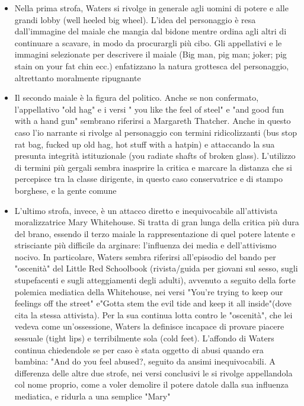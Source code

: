 \documentclass[class=book, crop=false, oneside, 12pt]{standalone}
\begin{document}
\begin{itemize}
    \item Nella prima strofa, Waters si rivolge in generale agli uomini di potere e alle grandi lobby (well heeled big wheel). L'idea del personaggio è resa dall'immagine del maiale che mangia dal bidone mentre ordina agli altri di continuare a scavare, in modo da procurargli più cibo. Gli appellativi e le immagini selezionate per descrivere il maiale (Big man, pig man; joker; pig stain on your fat chin ecc.) enfatizzano la natura grottesca del personaggio, altrettanto moralmente ripugnante
    \item Il secondo maiale è la figura del politico. Anche se non confermato, l'appellativo "old hag" e i versi " you like the feel of steel" e "and good fun with a hand gun" sembrano riferirsi a Margareth Thatcher. Anche in questo caso l'io narrante si rivolge al personaggio con termini ridicolizzanti (bus stop rat bag, fucked up old hag, hot stuff with a hatpin) e attaccando la sua presunta integrità istituzionale (you radiate shafts of broken glass). L'utilizzo di termini più gergali sembra inasprire la critica e marcare la distanza che si percepisce tra la classe dirigente, in questo caso conservatrice e di stampo borghese, e la gente comune
    \item L'ultimo strofa, invece, è un attacco diretto e inequivocabile all'attivista moralizzatrice Mary Whitehouse. Si tratta di gran lunga della critica più dura del brano, essendo il terzo maiale la rappresentazione di quel potere latente e strisciante più difficile da arginare: l'influenza dei media e dell'attivismo nocivo. In particolare, Waters sembra riferirsi all'episodio del bando per "oscenità" del Little Red Schoolbook (rivista/guida per giovani sul sesso, sugli stupefacenti e sugli atteggiamenti degli adulti), avvenuto a seguito della forte polemica mediatica della Whitehouse, nei versi "You're trying to keep our feelings off the street" e"Gotta stem the evil tide and keep it all inside"(dove cita la stessa attivista). Per la sua continua lotta contro le "oscenità", che lei vedeva come un'ossessione, Waters la definisce incapace di provare piacere sessuale (tight lips) e terribilmente sola (cold feet). L'affondo di Waters continua chiedendole se per caso è stata oggetto di abusi quando era bambina: "And do you feel abused?, seguito da ansimi inequivocabili. A differenza delle altre due strofe, nei versi conclusivi le si rivolge appellandola col nome proprio, come a voler demolire il potere datole dalla sua influenza mediatica, e ridurla a una semplice "Mary"
\end{itemize}
\end{document}
